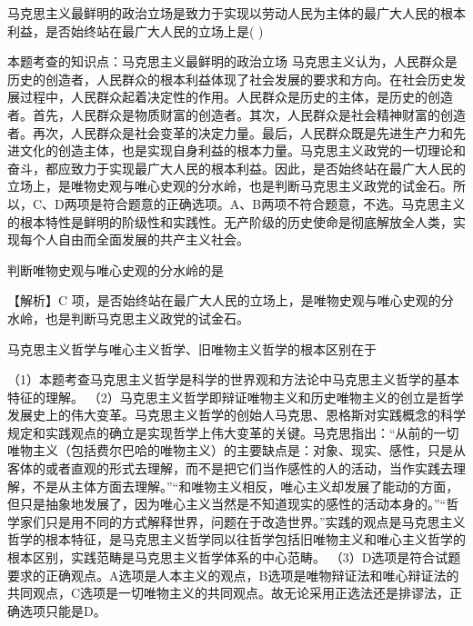 \question 马克思主义最鲜明的政治立场是致力于实现以劳动人民为主体的最广大人民的根本利益，是否始终站在最广大人民的立场上是(
)
\par{}
\begin{solution}本题考查的知识点：马克思主义最鲜明的政治立场
马克思主义认为，人民群众是历史的创造者，人民群众的根本利益体现了社会发展的要求和方向。在社会历史发展过程中，人民群众起着决定性的作用。人民群众是历史的主体，是历史的创造者。首先，人民群众是物质财富的创造者。其次，人民群众是社会精神财富的创造者。再次，人民群众是社会变革的决定力量。最后，人民群众既是先进生产力和先进文化的创造主体，也是实现自身利益的根本力量。马克思主义政党的一切理论和奋斗，都应致力于实现最广大人民的根本利益。因此，是否始终站在最广大人民的立场上，是唯物史观与唯心史观的分水岭，也是判断马克思主义政党的试金石。所以，C、D两项是符合题意的正确选项。A、B两项不符合题意，不选。马克思主义的根本特性是鲜明的阶级性和实践性。无产阶级的历史使命是彻底解放全人类，实现每个人自由而全面发展的共产主义社会。
\end{solution}
\question 判断唯物史观与唯心史观的{分水岭}的是
\par{}
\begin{solution}【解析】C
项，是否始终站在最广大人民的立场上，是唯物史观与唯心史观的分水岭，也是判断马克思主义政党的试金石。
\end{solution}
\question 马克思主义哲学与唯心主义哲学、旧唯物主义哲学的根本区别在于
\par{}
\begin{solution}（1）本题考查马克思主义哲学是科学的世界观和方法论中马克思主义哲学的基本特征的理解。
（2）马克思主义哲学即辩证唯物主义和历史唯物主义的创立是哲学发展史上的伟大变革。马克思主义哲学的创始人马克思、恩格斯对实践概念的科学规定和实践观点的确立是实现哲学上伟大变革的关键。马克思指出：``从前的一切唯物主义（包括费尔巴哈的唯物主义）的主要缺点是：对象、现实、感性，只是从客体的或者直观的形式去理解，而不是把它们当作感性的人的活动，当作实践去理解，不是从主体方面去理解。''``和唯物主义相反，唯心主义却发展了能动的方面，但只是抽象地发展了，因为唯心主义当然是不知道现实的感性的活动本身的。''``哲学家们只是用不同的方式解释世界，问题在于改造世界。''实践的观点是马克思主义哲学的根本特征，是马克思主义哲学同以往哲学包括旧唯物主义和唯心主义哲学的根本区别，实践范畴是马克思主义哲学体系的中心范畴。
（3）D选项是符合试题要求的正确观点。A选项是人本主义的观点，B选项是唯物辩证法和唯心辩证法的共同观点，C选项是一切唯物主义的共同观点。故无论采用正选法还是排谬法，正确选项只能是D。
\end{solution}
